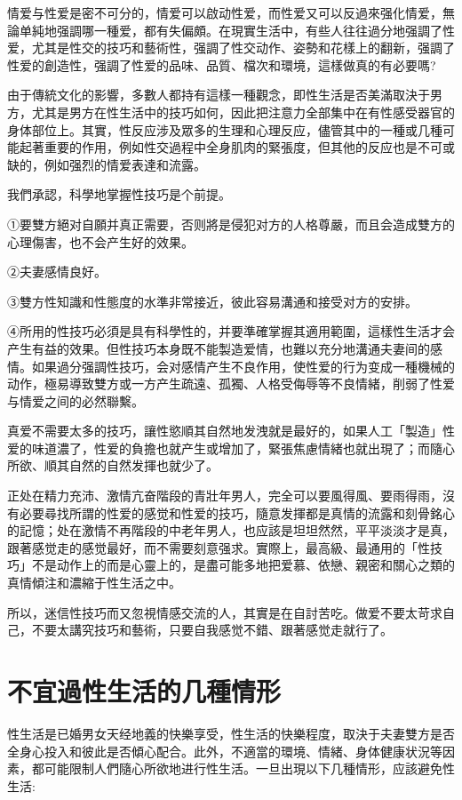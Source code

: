 \documentclass[12pt,UTF8]{ctexbook}
\begin{document}
情爱与性爱是密不可分的，情爱可以啟动性爱，而性爱又可以反過來强化情爱，無論单純地强調哪一種爱，都有失偏頗。在現實生活中，有些人往往過分地强調了性爱，尤其是性交的技巧和藝術性，强調了性交动作、姿勢和花樣上的翻新，强調了性爱的創造性，强調了性爱的品味、品質、檔次和環境，這樣做真的有必要嗎?

由于傳統文化的影響，多數人都持有這樣一種觀念，即性生活是否美滿取決于男方，尤其是男方在性生活中的技巧如何，因此把注意力全部集中在有性感受器官的身体部位上。其實，性反应涉及眾多的生理和心理反应，儘管其中的一種或几種可能起著重要的作用，例如性交過程中全身肌肉的緊張度，但其他的反应也是不可或缺的，例如强烈的情爱表達和流露。

我們承認，科學地掌握性技巧是个前提。

①要雙方絕对自願并真正需要，否则將是侵犯对方的人格尊嚴，而且会造成雙方的心理傷害，也不会产生好的效果。

②夫妻感情良好。

③雙方性知識和性態度的水準非常接近，彼此容易溝通和接受对方的安排。

④所用的性技巧必須是具有科學性的，并要準確掌握其適用範圍，這樣性生活才会产生有益的效果。但性技巧本身既不能製造爱情，也難以充分地溝通夫妻间的感情。如果過分强調性技巧，会对感情产生不良作用，使性爱的行为变成一種機械的动作，極易導致雙方或一方产生疏遠、孤獨、人格受侮辱等不良情緒，削弱了性爱与情爱之间的必然聯繫。

真爱不需要太多的技巧，讓性慾順其自然地发洩就是最好的，如果人工「製造」性爱的味道濃了，性爱的負擔也就产生或增加了，緊張焦慮情緒也就出現了；而隨心所欲、順其自然的自然发揮也就少了。

正处在精力充沛、激情亢奋階段的青壯年男人，完全可以要風得風、要雨得雨，沒有必要尋找所謂的性爱的感觉和性爱的技巧，隨意发揮都是真情的流露和刻骨銘心的記憶；处在激情不再階段的中老年男人，也应該是坦坦然然，平平淡淡才是真，跟著感觉走的感觉最好，而不需要刻意强求。實際上，最高級、最通用的「性技巧」不是动作上的而是心靈上的，是盡可能多地把爱慕、依戀、親密和關心之類的真情傾注和濃縮于性生活之中。

所以，迷信性技巧而又忽視情感交流的人，其實是在自討苦吃。做爱不要太苛求自己，不要太講究技巧和藝術，只要自我感觉不錯、跟著感觉走就行了。

\section{不宜過性生活的几種情形}

性生活是已婚男女天经地義的快樂享受，性生活的快樂程度，取決于夫妻雙方是否全身心投入和彼此是否傾心配合。此外，不適當的環境、情緒、身体健康状況等因素，都可能限制人們隨心所欲地进行性生活。一旦出現以下几種情形，应該避免性生活:
\end{document}
